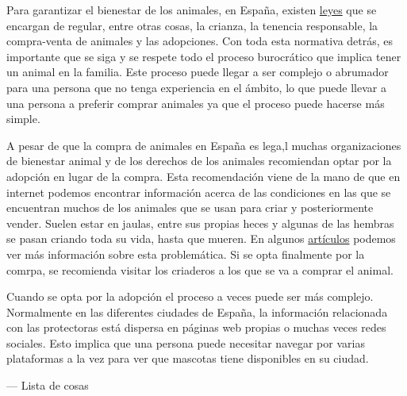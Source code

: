 \documentclass[a4paper, 12pt]{article}
\begin{document}
Para garantizar el bienestar de los animales, en España, existen \href{https://www.boe.es/buscar/doc.php?id=BOE-A-2023-7936}{leyes} que se encargan de regular, entre otras cosas, la crianza, la tenencia responsable, la compra-venta de animales y las adopciones. Con toda esta normativa detrás, es importante que se siga y se respete todo el proceso burocrático que implica tener un animal en la familia. Este proceso puede llegar a ser complejo o abrumador para una persona que no tenga experiencia en el ámbito, lo que puede llevar a una persona a preferir comprar animales ya que el proceso puede hacerse más simple. 

A pesar de que la compra de animales en España es lega,l muchas organizaciones de bienestar animal y de los derechos de los animales recomiendan optar por la adopción en lugar de la compra. Esta recomendación viene de la mano de que  en internet podemos encontrar información acerca de las condiciones en las que se encuentran muchos de los animales que se usan para criar y posteriormente vender. Suelen estar en jaulas, entre sus propias heces y algunas de las hembras se pasan criando toda su vida, hasta que mueren. En algunos \href{https://investigaciones.petalatino.com/animales-sufren-comercio-mascotas/}{artículos} podemos ver más información sobre esta problemática. Si se opta finalmente por la comrpa, se recomienda visitar los criaderos a los que se va a comprar el animal. 

Cuando se opta por la adopción el proceso a veces puede ser más complejo. Normalmente en las diferentes ciudades de España, la información relacionada con las protectoras está dispersa en páginas web propias o muchas veces redes sociales. Esto implica que una persona puede necesitar navegar por varias plataformas a la vez para ver que mascotas tiene disponibles en su ciudad. 

--- Lista de cosas
\printindex
\end{document}
